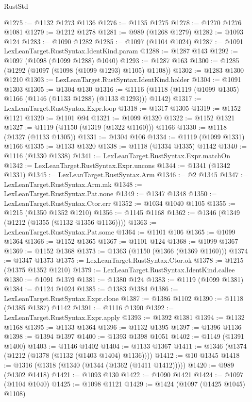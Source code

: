 \begin{lexlean}{RustStd}
\begin{coremodule}
@1275 := @1132 @1273 @1136
@1276 := @1135 @1275
@1278 := @1270 @1276 @1081
@1279 := @1212 @1278
@1281 := @989 (@1268 @1279)
@1282 := @1093 @124
@1283 := @1090 @1282
@1285 := @1097 (@1104 @1024)
@1287 := @1091 LexLeanTarget.RustSyntax.IdentKind.param
@1288 := @1287 @143
@1292 := @1097 (@1098 (@1099 @1288) @1040)
@1293 := @1287 @163
@1300 := @1285 (@1292 (@1097 (@1098 (@1099 @1293) @1105) @1108))
@1302 := @1283 @1300 @1210
@1303 := LexLeanTarget.RustSyntax.IdentKind.holder
@1304 := @1091 @1303
@1305 := @1304 @130
@1316 := @1116 (@1118 (@1119 (@1099 @1305) @1166 (@1146 (@1133 @1288) (@1133 @1293))) @1142)
@1317 := LexLeanTarget.RustSyntax.Expr.loop
@1318 := @1317 @1305
@1319 := @1152 @1121
@1320 := @1101 @94
@1321 := @1099 @1320
@1322 := @1152 @1321
@1327 := @1119 (@1150 (@1319 (@1322 @1160))) @1166
@1330 := @1118 (@1327 (@1133 @1305))
@1331 := @1304 @106
@1334 := @1119 (@1099 @1331) @1166
@1335 := @1133 @1320
@1338 := @1118 (@1334 @1335) @1142
@1340 := @1116 (@1330 @1338)
@1341 := LexLeanTarget.RustSyntax.Expr.matchOn
@1342 := LexLeanTarget.RustSyntax.Expr.uncons
@1344 := @1341 (@1342 @1331)
@1345 := LexLeanTarget.RustSyntax.Arm
@1346 := @2 @1345
@1347 := LexLeanTarget.RustSyntax.Arm.mk
@1348 := LexLeanTarget.RustSyntax.Pat.none
@1349 := @1347 @1348
@1350 := LexLeanTarget.RustSyntax.Ctor.err
@1352 := @1034 @1040 @1105
@1355 := @1215 (@1350 @1352 @1210)
@1356 := @1145 @1168
@1362 := @1346 (@1349 (@1212 (@1355 (@1132 @1356 @1136))))
@1363 := LexLeanTarget.RustSyntax.Pat.some
@1364 := @1101 @106
@1365 := @1099 @1364
@1366 := @1152 @1365
@1367 := @1101 @124
@1368 := @1099 @1367
@1369 := @1152 @1368
@1373 := @1363 (@1150 (@1366 (@1369 @1160)))
@1374 := @1347 @1373
@1375 := LexLeanTarget.RustSyntax.Ctor.ok
@1378 := @1215 (@1375 @1352 @1210)
@1379 := LexLeanTarget.RustSyntax.IdentKind.callee
@1380 := @1091 @1379
@1381 := @1380 @124
@1383 := @1119 (@1099 @1381)
@1384 := @1124 @1024
@1385 := @1383 @1384
@1386 := LexLeanTarget.RustSyntax.Expr.clone
@1387 := @1386 @1102
@1390 := @1118 (@1385 @1387) @1142
@1391 := @1116 @1390
@1392 := LexLeanTarget.RustSyntax.Expr.apply
@1393 := @1392 @1381
@1394 := @1132 @1168
@1395 := @1133 @1364
@1396 := @1132 @1395
@1397 := @1396 @1136
@1398 := @1394 @1397
@1400 := @1393 @1398 @1051
@1402 := @1149 (@1391 @1400)
@1403 := @1146 @1402
@1404 := @1133 @1367
@1411 := @1346 (@1374 (@1212 (@1378 (@1132 (@1403 @1404) @1136))))
@1412 := @10 @1345
@1418 := @1316 (@1318 (@1340 (@1344 (@1362 (@1411 @1412)))))
@1420 := @989 (@1302 @1418)
@1421 := @1093 @130
@1422 := @1090 @1421
@1424 := @1097 (@1104 @1040)
@1425 := @1098 @1121
@1429 := @1424 (@1097 (@1425 @1045) @1108)

\end{coremodule}
\end{lexlean}
